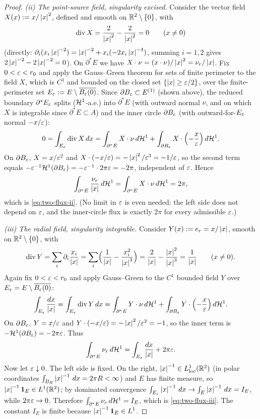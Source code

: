 \begin{proof}
\emph{(ii) The point-source field, singularity excised.}
Consider the vector field $X(x):=x/\left\lvert x\right\rvert^2$, defined and smooth on
$\mathbb{R}^2\setminus\{0\}$, with
\[
   \operatorname{div} X=\frac{2}{\left\lvert x\right\rvert^2}-\frac{2}{\left\lvert x\right\rvert^2}=0
   \qquad(x\ne0)
\]
(directly: $\partial_i(x_i\left\lvert x\right\rvert^{-2})=\left\lvert x\right\rvert^{-2}+x_i(-2x_i\left\lvert x\right\rvert^{-4})$,
summing $i=1,2$ gives $2\left\lvert x\right\rvert^{-2}-2\left\lvert x\right\rvert^{-2}=0$). On $\partial^*E$ we
have $X\cdot\nu=(x\cdot\nu)/\left\lvert x\right\rvert^2=\nu_r/\left\lvert x\right\rvert$. Fix $0<\varepsilon<r_0$ and
apply the Gauss--Green theorem for sets of finite perimeter
\cite[Theorem~5.16]{EvansGariepy2015} to the field $X$, which is $C^1$ and
bounded on the closed set $\{\left\lvert x\right\rvert\ge\varepsilon/2\}$, over the finite-perimeter
set $E_\varepsilon:=E\setminus\overline{B_\varepsilon(0)}$. Since $\partial B_\varepsilon\subset
E^{(1)}$ (shown above), the reduced boundary $\partial^*E_\varepsilon$ splits
($\mathcal{H}^1$-a.e.) into $\partial^*E$ (with outward normal $\nu$, and on which
$X$ is integrable since $\partial^*E\subset A$) and the inner circle
$\partial B_\varepsilon$ (with outward-for-$E_\varepsilon$ normal $-x/\varepsilon$):
\[
   0=\int_{E_\varepsilon}\operatorname{div} X\,dx
   =\int_{\partial^*E}X\cdot\nu\,d\mathcal{H}^1
   +\int_{\partial B_\varepsilon}X\cdot\Bigl(-\frac{x}{\varepsilon}\Bigr)\,d\mathcal{H}^1 .
\]
On $\partial B_\varepsilon$, $X=x/\varepsilon^2$ and $X\cdot(-x/\varepsilon)=-\left\lvert x\right\rvert^2/\varepsilon^3
=-1/\varepsilon$, so the second term equals $-\varepsilon^{-1}\mathcal{H}^1(\partial B_\varepsilon)
=-\varepsilon^{-1}\cdot2\pi\varepsilon=-2\pi$, independent of $\varepsilon$. Hence
\[
   \int_{\partial^*E}\frac{\nu_r}{\left\lvert x\right\rvert}\,d\mathcal{H}^1
   =\int_{\partial^*E}X\cdot\nu\,d\mathcal{H}^1=2\pi,
\]
which is \eqref{eq:two-flux-ii}. (No limit in $\varepsilon$ is even needed: the
left side does not depend on $\varepsilon$, and the inner-circle flux is exactly
$2\pi$ for every admissible $\varepsilon$.)

\emph{(iii) The radial field, singularity integrable.}
Consider $Y(x):=e_r=x/\left\lvert x\right\rvert$, smooth on $\mathbb{R}^2\setminus\{0\}$, with
\[
   \operatorname{div} Y=\sum_i\partial_i\frac{x_i}{\left\lvert x\right\rvert}
   =\sum_i\Bigl(\frac1{\left\lvert x\right\rvert}-\frac{x_i^2}{\left\lvert x\right\rvert^3}\Bigr)
   =\frac2{\left\lvert x\right\rvert}-\frac{\left\lvert x\right\rvert^2}{\left\lvert x\right\rvert^3}=\frac1{\left\lvert x\right\rvert}
   \qquad(x\ne0).
\]
Again fix $0<\varepsilon<r_0$ and apply Gauss--Green to the $C^1$ bounded field $Y$
over $E_\varepsilon=E\setminus\overline{B_\varepsilon(0)}$:
\[
   \int_{E_\varepsilon}\frac{dx}{\left\lvert x\right\rvert}
   =\int_{E_\varepsilon}\operatorname{div} Y\,dx
   =\int_{\partial^*E}Y\cdot\nu\,d\mathcal{H}^1
   +\int_{\partial B_\varepsilon}Y\cdot\Bigl(-\frac x{\varepsilon}\Bigr)\,d\mathcal{H}^1 .
\]
On $\partial B_\varepsilon$, $Y=x/\varepsilon$ and $Y\cdot(-x/\varepsilon)=-\left\lvert x\right\rvert^2/\varepsilon^2=-1$,
so the inner term is $-\mathcal{H}^1(\partial B_\varepsilon)=-2\pi\varepsilon$. Thus
\[
   \int_{\partial^*E}\nu_r\,d\mathcal{H}^1
   =\int_{E_\varepsilon}\frac{dx}{\left\lvert x\right\rvert}+2\pi\varepsilon .
\]
Now let $\varepsilon\downarrow0$. The left side is fixed. On the right,
$\left\lvert x\right\rvert^{-1}\in L^1_{\mathrm{loc}}(\mathbb{R}^2)$ (in polar coordinates
$\int_{B_R}\left\lvert x\right\rvert^{-1}\,dx=2\pi R<\infty$) and $E$ has finite measure, so
$\left\lvert x\right\rvert^{-1}\mathbf1_E\in L^1(\mathbb{R}^2)$; by dominated convergence
$\int_{E_\varepsilon}\left\lvert x\right\rvert^{-1}\,dx\to\int_E\left\lvert x\right\rvert^{-1}\,dx=I_E$, while
$2\pi\varepsilon\to0$. Therefore $\int_{\partial^*E}\nu_r\,d\mathcal{H}^1=I_E$, which is
\eqref{eq:two-flux-iii}. The constant $I_E$ is finite because
$\left\lvert x\right\rvert^{-1}\mathbf1_E\in L^1$.
\end{proof}

